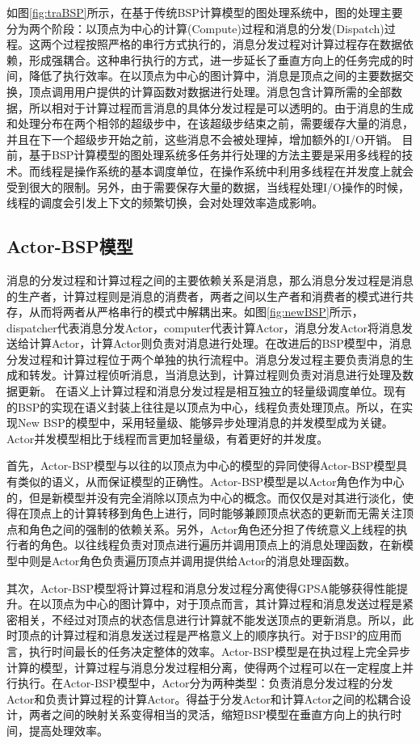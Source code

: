 如图\ref{fig:traBSP}所示，在基于传统BSP计算模型的图处理系统中，图的处理主要分为两个阶段：以顶点为中心的计算(Compute)过程和消息的分发(Dispatch)过程。这两个过程按照严格的串行方式执行的，消息分发过程对计算过程存在数据依赖，形成强耦合。这种串行执行的方式，进一步延长了垂直方向上的任务完成的时间，降低了执行效率。在以顶点为中心的图计算中，消息是顶点之间的主要数据交换，顶点调用用户提供的计算函数对数据进行处理。消息包含计算所需的全部数据，所以相对于计算过程而言消息的具体分发过程是可以透明的。由于消息的生成和处理分布在两个相邻的超级步中，在该超级步结束之前，需要缓存大量的消息，并且在下一个超级步开始之前，这些消息不会被处理掉，增加额外的I/O开销。
目前，基于BSP计算模型的图处理系统多任务并行处理的方法主要是采用多线程的技术。而线程是操作系统的基本调度单位，在操作系统中利用多线程在并发度上就会受到很大的限制。另外，由于需要保存大量的数据，当线程处理I/O操作的时候，线程的调度会引发上下文的频繁切换，会对处理效率造成影响。

\subsection{Actor-BSP模型}

消息的分发过程和计算过程之间的主要依赖关系是消息，那么消息分发过程是消息的生产者，计算过程则是消息的消费者，两者之间以生产者和消费者的模式进行共存，从而将两者从严格串行的模式中解耦出来。如图\ref{fig:newBSP}所示，dispatcher代表消息分发Actor，computer代表计算Actor，消息分发Actor将消息发送给计算Actor，计算Actor则负责对消息进行处理。在改进后的BSP模型中，消息分发过程和计算过程位于两个单独的执行流程中。消息分发过程主要负责消息的生成和转发。计算过程侦听消息，当消息达到，计算过程则负责对消息进行处理及数据更新。
在语义上计算过程和消息分发过程是相互独立的轻量级调度单位。现有的BSP的实现在语义封装上往往是以顶点为中心，线程负责处理顶点。所以，在实现New BSP的模型中，采用轻量级、能够异步处理消息的并发模型成为关键。Actor并发模型相比于线程而言更加轻量级，有着更好的并发度。

 首先，Actor-BSP模型与以往的以顶点为中心的模型的异同使得Actor-BSP模型具有类似的语义，从而保证模型的正确性。Actor-BSP模型是以Actor角色作为中心的，但是新模型并没有完全消除以顶点为中心的概念。而仅仅是对其进行淡化，使得在顶点上的计算转移到角色上进行，同时能够兼顾顶点状态的更新而无需关注顶点和角色之间的强制的依赖关系。另外，Actor角色还分担了传统意义上线程的执行者的角色。以往线程负责对顶点进行遍历并调用顶点上的消息处理函数，在新模型中则是Actor角色负责遍历顶点并调用提供给Actor的消息处理函数。

其次，Actor-BSP模型将计算过程和消息分发过程分离使得GPSA能够获得性能提升。在以顶点为中心的图计算中，对于顶点而言，其计算过程和消息发送过程是紧密相关，不经过对顶点的状态信息进行计算就不能发送顶点的更新消息。所以，此时顶点的计算过程和消息发送过程是严格意义上的顺序执行。对于BSP的应用而言，执行时间最长的任务决定整体的效率。Actor-BSP模型是在执过程上完全异步计算的模型，计算过程与消息分发过程相分离，使得两个过程可以在一定程度上并行执行。在Actor-BSP模型中，Actor分为两种类型：负责消息分发过程的分发Actor和负责计算过程的计算Actor。得益于分发Actor和计算Actor之间的松耦合设计，两者之间的映射关系变得相当的灵活，缩短BSP模型在垂直方向上的执行时间，提高处理效率。

